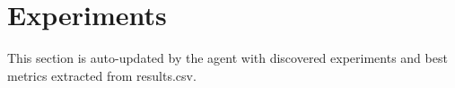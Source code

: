 \section{Experiments}
This section is auto-updated by the agent with discovered experiments and best metrics extracted from results.csv.
